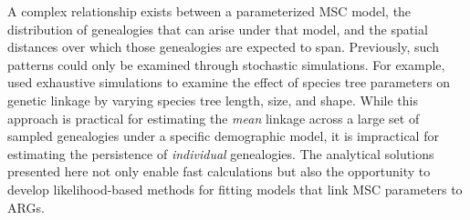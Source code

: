\documentclass[11pt]{article}
\begin{document}
A complex relationship exists between a parameterized MSC model, 
the distribution of genealogies that can arise under that model, and the 
spatial distances over which those genealogies are expected to span.
Previously, such patterns could only be examined through stochastic simulations. 
For example, \cite{mckenzie_multispecies_2020} used exhaustive simulations to examine 
the effect of species tree parameters on genetic linkage by varying species tree
length, size, and shape. 
While this approach is practical for estimating the \emph{mean} linkage across
a large set of sampled genealogies under a specific demographic model, it is
impractical for estimating the persistence of \emph{individual} genealogies. 
The analytical solutions presented here not only enable fast calculations but also the opportunity to develop likelihood-based
methods for fitting models that link MSC parameters to ARGs.


\end{document}
